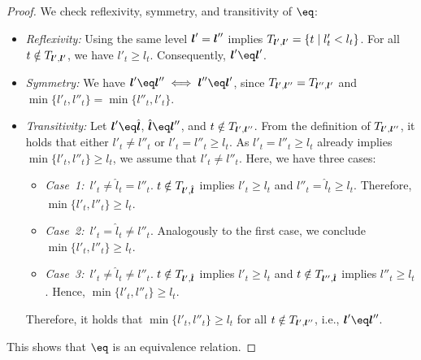 \begin{proof}
  We check reflexivity, symmetry, and transitivity of $\eq$:
  \begin{itemize}
    \item
    \emph{Reflexivity:}
    Using the same level ${\boldsymbol{l}}' = {\boldsymbol{l}}''$ implies
    $T_{{\boldsymbol{l}}',{\boldsymbol{l}}'} = \{t \mid l'_t < l_t\}$.
    For all $t \notin T_{{\boldsymbol{l}}',{\boldsymbol{l}}'}$, we have $l'_t \ge l_t$.
    Consequently, $\*l' \eq \*l'$.
    
    \item
    \emph{Symmetry:}
    We have
    $\*l' \eq \*l'' \iff \*l'' \eq \*l'$, since
    $T_{{\boldsymbol{l}}',{\boldsymbol{l}}''} = T_{{\boldsymbol{l}}'',{\boldsymbol{l}}'}$ and
    $\min\{l'_t, l''_t\} = \min\{l''_t, l'_t\}$.
    
    \item
    \emph{Transitivity:}
    Let $\*l' \eq \hat{\*l}$, $\hat{\*l} \eq \*l''$, and
    $t \notin T_{{\boldsymbol{l}}',{\boldsymbol{l}}''}$.
    From the definition of $T_{{\boldsymbol{l}}',{\boldsymbol{l}}''}$,
    it holds that either $l'_t \not= l''_t$ or $l'_t = l''_t \ge l_t$.
    As $l'_t = l''_t \ge l_t$ already implies $\min\{l'_t, l''_t\} \ge l_t$,
    we assume that $l'_t \not= l''_t$.
    Here, we have three cases:
    \begin{itemize}
      \item
      \mbox{\emph{Case 1:} ${l'_t \not= \hat{l}_t = l''_t}$.}
      $t \notin T_{{\boldsymbol{l}}',\hat{{\boldsymbol{l}}}}$ implies $l'_t \ge l_t$ and
      $l''_t = \hat{l}_t \ge l_t$.
      Therefore, $\min\{l'_t, l''_t\} \ge l_t$.
      
      \item
      \mbox{\emph{Case 2:} ${l'_t = \hat{l}_t \not= l''_t}$.}
      Analogously to the first case, we conclude $\min\{l'_t, l''_t\} \ge l_t$.
      
      \item
      \mbox{\emph{Case 3:} ${l'_t \not= \hat{l}_t \not= l''_t}$.}
      $t \notin T_{{\boldsymbol{l}}',\hat{{\boldsymbol{l}}}}$ implies $l'_t \ge l_t$ and
      $t \notin T_{{\boldsymbol{l}}'',\hat{{\boldsymbol{l}}}}$ implies $l''_t \ge l_t$.
      Hence, $\min\{l'_t, l''_t\} \ge l_t$.
    \end{itemize}
    Therefore, it holds that $\min\{l'_t, l''_t\} \ge l_t$
    for all $t \notin T_{{\boldsymbol{l}}',{\boldsymbol{l}}''}$, i.e., $\*l' \eq \*l''$.
  \end{itemize}
  This shows that $\eq$ is an equivalence relation.
\end{proof}


\lemmaCombiTechniqueIdenticalValues*

